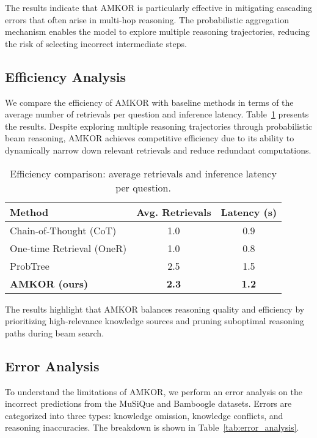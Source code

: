 The results indicate that AMKOR is particularly effective in mitigating cascading errors that often arise in multi-hop reasoning. The probabilistic aggregation mechanism enables the model to explore multiple reasoning trajectories, reducing the risk of selecting incorrect intermediate steps.


\subsection{Efficiency Analysis}

We compare the efficiency of AMKOR with baseline methods in terms of the average number of retrievals per question and inference latency. Table~\ref{tab:efficiency} presents the results. Despite exploring multiple reasoning trajectories through probabilistic beam reasoning, AMKOR achieves competitive efficiency due to its ability to dynamically narrow down relevant retrievals and reduce redundant computations.

\begin{table}[ht]
\centering
\caption{Efficiency comparison: average retrievals and inference latency per question.}
\label{tab:efficiency}
\begin{tabular}{lcc}
\toprule
\textbf{Method} & \textbf{Avg. Retrievals} & \textbf{Latency (s)} \\
\midrule
Chain-of-Thought (CoT) & 1.0 & 0.9 \\
One-time Retrieval (OneR) & 1.0 & 0.8 \\
ProbTree & 2.5 & 1.5 \\
\textbf{AMKOR (ours)} & \textbf{2.3} & \textbf{1.2} \\
\bottomrule
\end{tabular}
\end{table}

The results highlight that AMKOR balances reasoning quality and efficiency by prioritizing high-relevance knowledge sources and pruning suboptimal reasoning paths during beam search.

\subsection{Error Analysis}

To understand the limitations of AMKOR, we perform an error analysis on the incorrect predictions from the MuSiQue and Bamboogle datasets. Errors are categorized into three types: knowledge omission, knowledge conflicts, and reasoning inaccuracies. The breakdown is shown in Table~\ref{tab:error_analysis}.

